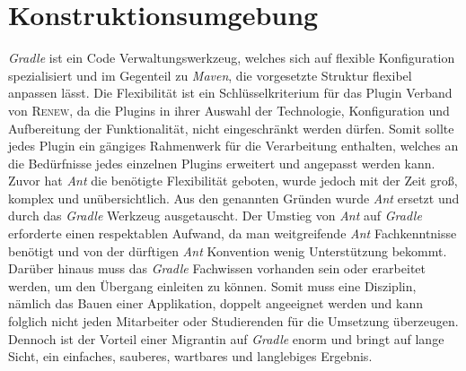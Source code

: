 \section{Konstruktionsumgebung}
\textit{Gradle} ist ein Code Verwaltungswerkzeug, welches sich auf flexible Konfiguration spezialisiert und im Gegenteil zu \textit{Maven}, die vorgesetzte Struktur flexibel anpassen lässt. Die Flexibilität ist ein Schlüsselkriterium für das Plugin Verband von \textsc{Renew}, da die Plugins in ihrer Auswahl der Technologie, Konfiguration und Aufbereitung der Funktionalität, nicht eingeschränkt werden dürfen. Somit sollte jedes Plugin ein gängiges Rahmenwerk für die Verarbeitung enthalten, welches an die Bedürfnisse jedes einzelnen Plugins erweitert und angepasst werden kann. Zuvor hat \textit{Ant} die benötigte Flexibilität geboten, wurde jedoch mit der Zeit groß, komplex und unübersichtlich. Aus den genannten Gründen wurde \textit{Ant} ersetzt und durch das \textit{Gradle} Werkzeug ausgetauscht.\newline
Der Umstieg von \textit{Ant} auf \textit{Gradle} erforderte einen respektablen Aufwand, da man weitgreifende \textit{Ant} Fachkenntnisse benötigt und von der dürftigen \textit{Ant} Konvention wenig Unterstützung bekommt. Darüber hinaus muss das \textit{Gradle} Fachwissen vorhanden sein oder erarbeitet werden, um den Übergang einleiten zu können. Somit muss eine Disziplin, nämlich das Bauen einer Applikation, doppelt angeeignet werden und kann folglich nicht jeden Mitarbeiter oder Studierenden für die Umsetzung überzeugen. Dennoch ist der Vorteil einer Migrantin auf \textit{Gradle} enorm und bringt auf lange Sicht, ein einfaches, sauberes, wartbares und langlebiges Ergebnis. \bigbreak

